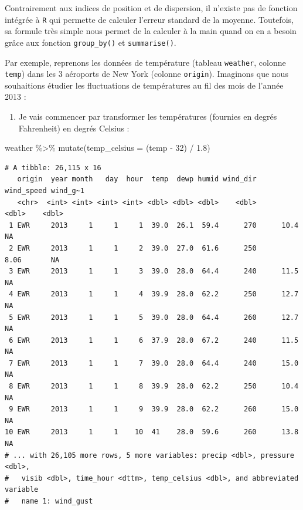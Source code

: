 \documentclass[
  a4paper,
  DIV=11,
  numbers=noendperiod,
  oneside]{scrreprt}
\newenvironment{Shaded}{}{}
\newcommand{\AttributeTok}[1]{\textcolor[rgb]{0.84,0.23,0.29}{#1}}
\newcommand{\DecValTok}[1]{\textcolor[rgb]{0.00,0.36,0.77}{#1}}
\newcommand{\FloatTok}[1]{\textcolor[rgb]{0.00,0.36,0.77}{#1}}
\newcommand{\FunctionTok}[1]{\textcolor[rgb]{0.44,0.26,0.76}{#1}}
\newcommand{\NormalTok}[1]{\textcolor[rgb]{0.14,0.16,0.18}{#1}}
\newcommand{\SpecialCharTok}[1]{\textcolor[rgb]{0.00,0.36,0.77}{#1}}
\providecommand{\tightlist}{%
  \setlength{\itemsep}{0pt}\setlength{\parskip}{0pt}}\usepackage{longtable,booktabs,array}
\begin{document}
Contrairement aux indices de position et de dispersion, il n'existe pas
de fonction intégrée à \texttt{R} qui permette de calculer l'erreur
standard de la moyenne. Toutefois, sa formule très simple nous permet de
la calculer à la main quand on en a besoin grâce aux fonction
\texttt{group\_by()} et \texttt{summarise()}.

Par exemple, reprenons les données de température (tableau
\texttt{weather}, colonne \texttt{temp}) dans les 3 aéroports de New
York (colonne \texttt{origin}). Imaginons que nous souhaitions étudier
les fluctuations de températures au fil des mois de l'année 2013 :

\begin{enumerate}
\def\labelenumi{\arabic{enumi}.}
\tightlist
\item
  Je vais commencer par transformer les températures (fournies en degrés
  Fahrenheit) en degrés Celsius :
\end{enumerate}

\begin{Shaded}
\begin{Highlighting}[]
\NormalTok{weather }\SpecialCharTok{\%\textgreater{}\%} 
  \FunctionTok{mutate}\NormalTok{(}\AttributeTok{temp\_celsius =}\NormalTok{ (temp }\SpecialCharTok{{-}} \DecValTok{32}\NormalTok{) }\SpecialCharTok{/} \FloatTok{1.8}\NormalTok{)}
\end{Highlighting}
\end{Shaded}

\begin{verbatim}
# A tibble: 26,115 x 16
   origin  year month   day  hour  temp  dewp humid wind_dir wind_speed wind_g~1
   <chr>  <int> <int> <int> <int> <dbl> <dbl> <dbl>    <dbl>      <dbl>    <dbl>
 1 EWR     2013     1     1     1  39.0  26.1  59.4      270      10.4        NA
 2 EWR     2013     1     1     2  39.0  27.0  61.6      250       8.06       NA
 3 EWR     2013     1     1     3  39.0  28.0  64.4      240      11.5        NA
 4 EWR     2013     1     1     4  39.9  28.0  62.2      250      12.7        NA
 5 EWR     2013     1     1     5  39.0  28.0  64.4      260      12.7        NA
 6 EWR     2013     1     1     6  37.9  28.0  67.2      240      11.5        NA
 7 EWR     2013     1     1     7  39.0  28.0  64.4      240      15.0        NA
 8 EWR     2013     1     1     8  39.9  28.0  62.2      250      10.4        NA
 9 EWR     2013     1     1     9  39.9  28.0  62.2      260      15.0        NA
10 EWR     2013     1     1    10  41    28.0  59.6      260      13.8        NA
# ... with 26,105 more rows, 5 more variables: precip <dbl>, pressure <dbl>,
#   visib <dbl>, time_hour <dttm>, temp_celsius <dbl>, and abbreviated variable
#   name 1: wind_gust
\end{verbatim}
\end{document}
